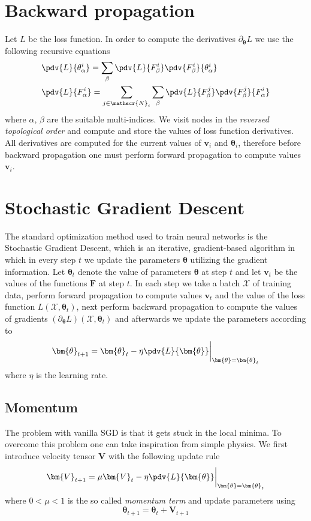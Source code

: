 \documentclass[a5paper]{article}
\newcommand{\mc}[1]{\mathcal{#1}}
\begin{document}
\section{Backward propagation}

Let \(L\) be the loss function. In order to compute the derivatives
\(\partial_{\bm{\theta}}L\) we use the following recursive equations
\[
\begin{split} 
   &\pdv{L}{\theta^i_\alpha} = \sum_\beta \pdv{L}{F^{i}_\beta} \pdv{F^{i}_\beta}{\theta^{i}_\alpha} \\
   &\pdv{L}{F_\alpha^{i}} = \sum_{j \in \mathscr{N}_i} \sum_\beta \pdv{L}{F_\beta^{j}} \pdv{F_\beta ^{j}}{F_\alpha^{i}}
\end{split}
\] 
where \(\alpha\), \(\beta\) are the suitable multi-indices. We visit nodes in the \emph{reversed
topological order} and compute and store the values of loss function derivatives. All derivatives
are computed for the current values of \(\bm{v}_i\) and \(\bm{\theta}_i\), therefore before backward
propagation one must perform forward propagation to compute values \(\bm{v}_i\).


\section{Stochastic Gradient Descent}

The standard optimization method used to train neural networks is the Stochastic Gradient Descent,
which is an iterative, gradient-based algorithm in which in every step \(t\) we update the
parameters \(\bm{\theta}\) utilizing the gradient information. Let \(\bm{\theta}_t\) denote the
value of parameters \(\bm{\theta}\) at step \(t\) and let \(\bm{v}_t\) be the values of the
functions \(\bm{F}\) at step \(t\). In each step we take a batch \(\mc{X}\)  of training data,
perform forward propagation to compute values \(\bm{v}_t\) and the value of the loss function
\(L(\mc{X},\bm{\theta}_t)\), next perform backward propagation to compute the values of gradients
\((\partial_{\bm{\theta}}L)\left(\mc{X},\bm{\theta}_t\right)\) and afterwards we update the
parameters according to
\[
   \bm{\theta}_{t+1} = \bm{\theta}_t - \eta \pdv{L}{\bm{\theta}}\bigg|_{\bm{\theta}=\bm{\theta}_t}
\] 
where \(\eta\) is the learning rate.


\subsection{Momentum}

The problem with vanilla SGD is that it gets stuck in the local minima. To overcome this problem one
can take inspiration from simple physics. We first introduce velocity tensor \(\bm{V}\) with the
following update rule
\[
   \bm{V}_{t+1} = \mu \bm{V}_{t} - \eta \pdv{L}{\bm{\theta}}\bigg|_{\bm{\theta}=\bm{\theta}_t}
\] 
where \(0 < \mu < 1\) is the so called \emph{momentum term} and update parameters using
\[
   \bm{\theta}_{t+1} = \bm{\theta}_t + \bm{V}_{t+1}
\]
\end{document}
